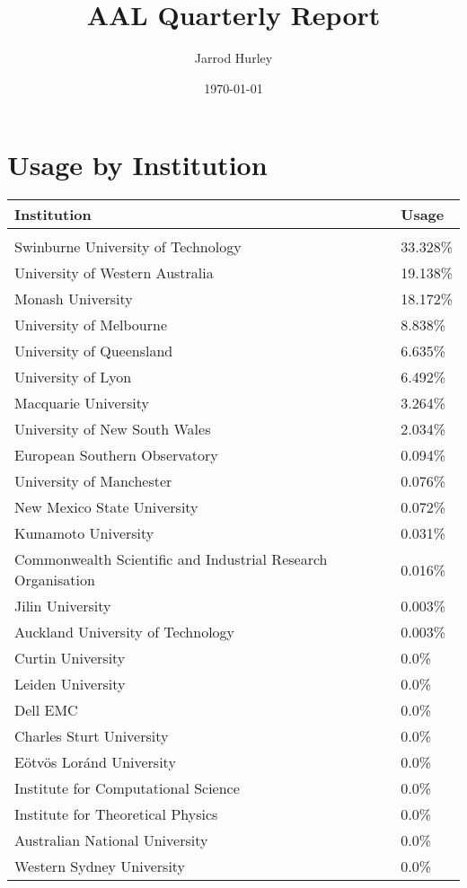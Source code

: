 \documentclass{article}%
\title{AAL Quarterly Report}%
\author{Jarrod Hurley}%
\date{\today}%
\begin{document}
%
\normalsize%
\maketitle%
\newpage%
\section{Usage by Institution }%

%
\begin{longtabu}{X[l] X[r]}%
\textbf{Institution}&\textbf{Usage}\\%
\hline%
&\\%
Swinburne University of Technology&33.328\%\\%
\hline%
University of Western Australia&19.138\%\\%
\hline%
Monash University&18.172\%\\%
\hline%
University of Melbourne&8.838\%\\%
\hline%
University of Queensland&6.635\%\\%
\hline%
University of Lyon&6.492\%\\%
\hline%
Macquarie University&3.264\%\\%
\hline%
University of New South Wales&2.034\%\\%
\hline%
European Southern Observatory&0.094\%\\%
\hline%
University of Manchester&0.076\%\\%
\hline%
New Mexico State University&0.072\%\\%
\hline%
Kumamoto University&0.031\%\\%
\hline%
Commonwealth Scientific and Industrial Research Organisation&0.016\%\\%
\hline%
Jilin University&0.003\%\\%
\hline%
Auckland University of Technology&0.003\%\\%
\hline%
Curtin University&0.0\%\\%
\hline%
Leiden University&0.0\%\\%
\hline%
Dell EMC&0.0\%\\%
\hline%
Charles Sturt University&0.0\%\\%
\hline%
Eötvös Loránd University&0.0\%\\%
\hline%
Institute for Computational Science&0.0\%\\%
\hline%
Institute for Theoretical Physics&0.0\%\\%
\hline%
Australian National University&0.0\%\\%
\hline%
Western Sydney University&0.0\%\\%

\end{longtabu}
\end{document}

